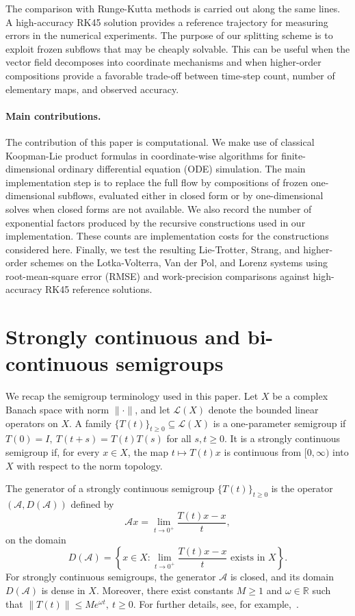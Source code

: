 \documentclass[preprint,1p,times,nopreprintline]{elsarticle}
\begin{document}
The comparison with Runge-Kutta methods is carried out along the same lines. A high-accuracy RK45 solution provides a reference trajectory for measuring errors in the numerical experiments. The purpose of our splitting scheme is to exploit frozen subflows that may be cheaply solvable. This can be useful when the vector field decomposes into coordinate mechanisms and when higher-order compositions provide a favorable trade-off between time-step count, number of elementary maps, and observed accuracy.

\paragraph{Main contributions.}
The contribution of this paper is computational. We make use of classical Koopman-Lie product formulas in coordinate-wise algorithms for finite-dimensional ordinary differential equation (ODE) simulation. The main implementation step is to replace the full flow by compositions of frozen one-dimensional subflows, evaluated either in closed form or by one-dimensional solves when closed forms are not available. We also record the number of exponential factors produced by the recursive constructions used in our implementation. These counts are implementation costs for the constructions considered here. Finally, we test the resulting Lie-Trotter, Strang, and higher-order schemes on the Lotka-Volterra, Van der Pol, and Lorenz systems using root-mean-square error (RMSE) and work-precision comparisons against high-accuracy RK45 reference solutions.

\section{Strongly continuous and bi-continuous semigroups}
\label{sec:koopmansemigroup}

We recap the semigroup terminology used in this paper. Let $X$ be a complex Banach space with norm $\|\cdot\|$, and let $\mathcal{L}(X)$ denote the bounded linear operators on $X$. A family $\{T(t)\}_{t\ge 0}\subseteq\mathcal{L}(X)$ is a one-parameter semigroup if $T(0)=I,~T(t+s)=T(t)T(s)$ for all $s,t\ge 0$. It is a strongly continuous semigroup if, for every $x\in X$, the map $t\mapsto T(t)x$ is continuous from $[0,\infty)$ into $X$ with respect to the norm topology.

The generator of a strongly continuous semigroup $\{T(t)\}_{t\ge 0}$ is the operator $(\mathcal{A},D(\mathcal{A}))$ defined by
\[
\mathcal{A}x
=
\lim_{t\to 0^+}\frac{T(t)x-x}{t},
\]
on the domain
\[
D(\mathcal{A})
=
\left\{
x\in X:
\lim_{t\to 0^+}\frac{T(t)x-x}{t}
\text{ exists in }X
\right\}.
\]
For strongly continuous semigroups, the generator $\mathcal{A}$ is closed, and its domain $D(\mathcal{A})$ is dense in $X$. Moreover, there exist constants $M\ge 1$ and $\omega\in\mathbb{R}$ such that $\|T(t)\|\le M e^{\omega t},~t\ge 0$. For further details, see, for example,~\citet{nagel2,pazy,gold}.
\end{document}
